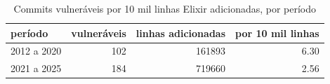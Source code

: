 \begin{table}[htbp]
\centering
\caption{Commits vulneráveis por 10 mil linhas Elixir adicionadas, por período}
\label{tab:volume_vulneraveis_periodos}
\begin{tabular}{lrrr}
\toprule
período & vulneráveis & linhas adicionadas & por 10 mil linhas \\
\midrule
2012 a 2020 & 102 & 161893 & 6.30 \\
2021 a 2025 & 184 & 719660 & 2.56 \\
\bottomrule
\end{tabular}
\end{table}
